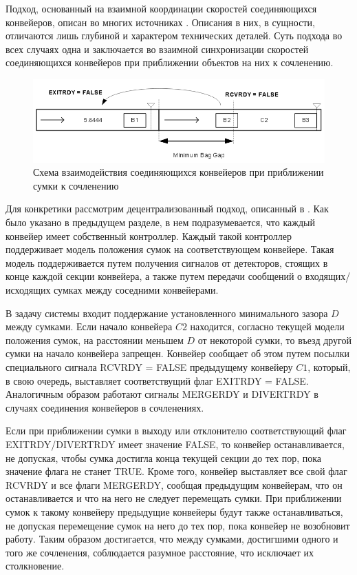 \documentclass[specification,annotation,times]{itmo-student-thesis}
\theoremstyle{definition}
\begin{document}
Подход, основанный на взаимной координации скоростей соединяющихся конвейеров,
описан во многих источниках \cite{black2009intelligent, schafer2011material}.
Описания в них, в сущности, отличаются лишь глубиной и характером технических
деталей. Суть подхода во всех случаях одна и заключается во взаимной
синхронизации скоростей соединяющихся конвейеров при приближении объектов на них
к сочленению.

\begin{figure}[!h]
  \caption{Схема взаимодействия соединяющихся конвейеров при приближении сумки к
  сочленению}\label{collision-avoidance-1}
  \centering
  \includegraphics[width=\textwidth]{collision-avoidance-1}
\end{figure}

Для конкретики рассмотрим децентрализованный подход, описанный в
\cite{black2009intelligent}. Как было указано в предыдущем разделе, в нем
подразумевается, что каждый конвейер имеет собственный контроллер. Каждый
такой контроллер поддерживает модель положения сумок на соответствующем
конвейере. Такая модель поддерживается путем получения сигналов от детекторов,
стоящих в конце каждой секции конвейера, а также путем передачи сообщений о
входящих/исходящих сумках между соседними конвейерами.

В задачу системы входит поддержание установленного минимального зазора $D$ между
сумками. Если начало конвейера $C2$ находится, согласно текущей модели положения
сумок, на расстоянии меньшем $D$ от некоторой сумки, то въезд другой сумки на
начало конвейера запрещен. Конвейер сообщает об этом путем посылки специального
сигнала RCVRDY = FALSE предыдущему конвейеру $C1$, который, в свою очередь,
выставляет соответствущий флаг EXITRDY = FALSE. Аналогичным образом работают
сигналы MERGERDY и DIVERTRDY в случаях соединения конвейеров в сочленениях.

Если при приближении сумки в выходу или отклонителю соответствующий флаг
EXITRDY/DIVERTRDY имеет значение FALSE, то конвейер останавливается, не
допуская, чтобы сумка достигла конца текущей секции до тех пор, пока значение
флага не станет TRUE. Кроме того, конвейер выставляет все свой флаг RCVRDY и все
флаги MERGERDY, сообщая предыдущим конвейерам, что он останавливается и что на
него не следует перемещать сумки. При приближении сумок к такому конвейеру
предыдущие конвейеры будут также останавливаться, не допуская перемещение сумок
на него до тех пор, пока конвейер не возобновит работу. Таким образом
достигается, что между сумками, достигшими одного и того же сочленения,
соблюдается разумное расстояние, что исключает их столкновение.
\end{document}

